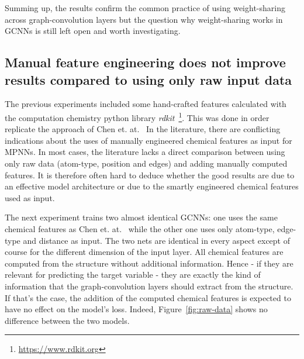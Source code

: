 Summing up, the results confirm the common practice of using weight-sharing across graph-convolution layers but the question why weight-sharing works in GCNNs is still left open and worth investigating.


\subsection{Manual feature engineering does not improve results compared to using only raw input data}
\label{sec:raw-data}

The previous experiments included some hand-crafted features calculated with the computation chemistry python library \textit{rdkit}~\footnote{\url{https://www.rdkit.org}}. This was done in order replicate the approach of Chen et. at.~\cite{Chen2019} In the literature, there are conflicting
indications about the uses of manually engineered chemical features as input for MPNNs. In most cases, the literature lacks a direct comparison between using only raw data (atom-type, position and edges) and adding manually computed features. It is therefore often hard to deduce whether the good results are due to an effective model architecture or due to the smartly engineered chemical features used as input.

The next experiment trains two almost identical GCNNs: one uses the same chemical features as Chen et. at.~\cite{Chen2019} while the other one uses only atom-type, edge-type and distance as input. The two nets are identical in every aspect except of course for the different dimension of the input layer. All chemical features
are computed from the structure without additional information. Hence - if they are relevant for predicting the target variable - they are exactly the kind of information that the graph-convolution layers should extract from the structure. If that's the case, the addition of the computed chemical features is expected to have no effect on the model's loss. Indeed, Figure~\ref{fig:raw-data} shows no difference between the two models.


